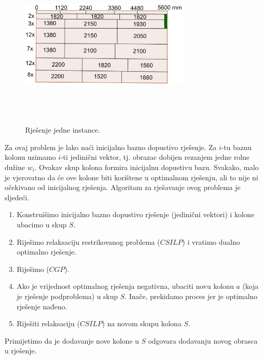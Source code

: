\documentclass[a4paper, utf8, 11pt, colorlinks]{book}
\theoremstyle{definition}
\begin{document}
 \begin{figure}[!ht]
     \centering
     \includegraphics[width=230pt, height=230pt]{cutting_stock.eps}
     \caption{Rješenje jedne instance.}
     \label{fig:cuting_stock_solutions}
 \end{figure}
 Za ovaj problem je lako naći inicijalno bazno dopustivo rješenje.
 Za $i$-tu baznu kolonu uzimamo $i$-ti jedinični vektor, tj. obrazac dobijen rezanjem jedne rolne dužine $w_i$. Ovakav skup kolona formira inicijalnu dopustivu bazu. Svakako, malo je vjerovatno da će ove kolone biti korištene u optimalnom rješenju, ali to nije ni očekivano od inicijalnog rješenja. 
 Algoritam za rješavanje ovog problema je sljedeći.
 \begin{enumerate}
     \item Konstruišimo inicijalno bazno dopustivo rješenje (jedinični vektori) i kolone ubacimo u skup $S$.
     \item Riješimo relaksaciju restrikovanog problema ($CSILP$) i vratimo dualno optimalno rješenje. 
     \item Riješimo ($CGP$).
     \item Ako je vrijednost optimalnog rješenja negativna, ubaciti novu kolonu $a$ (koja je rješenje podproblema) u skup $S$. Inače, prekidamo proces jer je optimalno rješenje nađeno. 
     \item Riješiti relaksaciju ($CSILP$) na novom skupu kolona $S$.
 \end{enumerate}
 Primijetimo da je dodavanje nove kolone u $S$ odgovara dodavanju novog obrasca u rješenje. 
 
\end{document}
